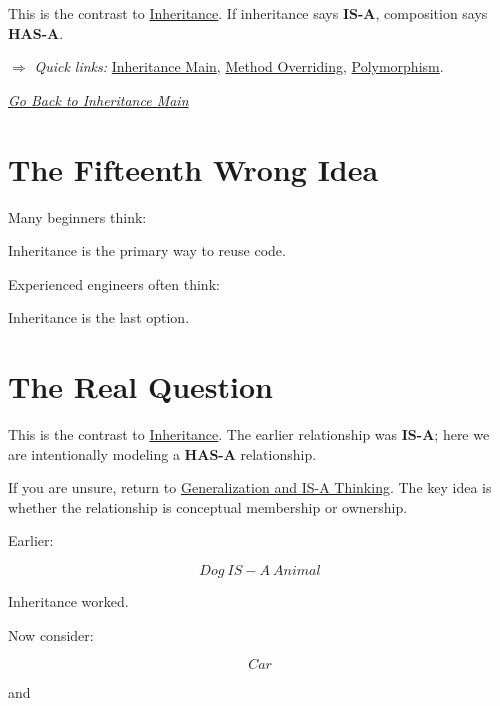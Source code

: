 \documentclass[11pt,a4paper]{book}
\begin{document}
\smallskip

This is the contrast to \hyperref[chap:inheritance]{Inheritance}.
If inheritance says \textbf{IS-A}, composition says \textbf{HAS-A}.

\smallskip
\noindent
\textcolor{RosettaRoyalPurple}{$\Rightarrow$}
\emph{Quick links: }
\hyperref[chap:inheritance]{Inheritance Main},
\hyperref[sec:method_overriding]{Method Overriding},
\hyperref[chap:polymorphism]{Polymorphism}.

\smallskip
\noindent
\hyperref[chap:inheritance]{\emph{Go Back to Inheritance Main}}


\section{The Fifteenth Wrong Idea}

\begin{trap}

Many beginners think:

Inheritance is the primary way
to reuse code.

Experienced engineers often think:

Inheritance is the last option.

\end{trap}


\section{The Real Question}

This is the contrast to \hyperref[chap:inheritance]{Inheritance}. The earlier relationship was \textbf{IS-A}; here we are intentionally modeling a \textbf{HAS-A} relationship.

If you are unsure, return to \hyperref[chap:generalization]{Generalization and IS-A Thinking}. The key idea is whether the relationship is conceptual membership or ownership.

Earlier:

\[
Dog\ IS\!-\!A\ Animal
\]

Inheritance worked.


Now consider:

\[
Car
\]

and
\end{document}
